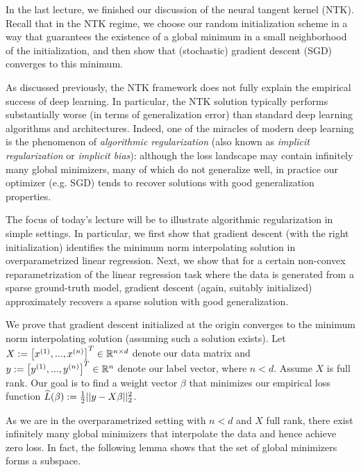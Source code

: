 \setcounter{section}{0}



In the last lecture, we finished our discussion of the neural tangent kernel (NTK). Recall that in the NTK regime, we choose our random initialization scheme in a way that guarantees the existence of a global minimum in a small neighborhood of the initialization, and then show that (stochastic) gradient descent (SGD) converges to this minimum. 

As discussed previously, the NTK framework does not fully explain the empirical success of deep learning. In particular, the NTK solution typically performs substantially worse (in terms of generalization error) than standard deep learning algorithms and architectures. Indeed, one of the miracles of modern deep learning is the phenomenon of \textit{algorithmic regularization} (also known as \textit{implicit regularization} or \textit{implicit bias}): although the loss landscape may contain infinitely many global minimizers, many of which do not generalize well, in practice our optimizer (e.g. SGD) tends to recover solutions with good generalization properties.

The focus of today's lecture will be to illustrate algorithmic regularization in simple settings. In particular, we first show that gradient descent (with the right initialization) identifies the minimum norm interpolating solution in overparametrized linear regression. Next, we show that for a certain non-convex reparametrization of the linear regression task where the data is generated from a sparse ground-truth model, gradient descent (again, suitably initialized) approximately recovers a sparse solution with good generalization.

\label{lec13:sec:olr}
We prove that gradient descent initialized at the origin converges to the minimum norm interpolating solution (assuming such a solution exists). Let $X:= \left[x^{(1)},...,x^{(n)} \right]^T \in \mathbb R^{n \times d}$ denote our data matrix and $y:= \left[y^{(1)},...,y^{(n)} \right]^T \in \mathbb R^n$ denote our label vector, where $n < d$. Assume $X$ is full rank. Our goal is to find a weight vector $\beta$ that minimizes our empirical loss function $\widehat{L} (\beta) := \frac{1}{2}||y - X\beta||_2^2$.

As we are in the overparametrized setting with $n < d$ and $X$ full rank, there exist infinitely many global minimizers that interpolate the data and hence achieve zero loss. In fact, the following lemma shows that the set of global minimizers forms a subspace.

